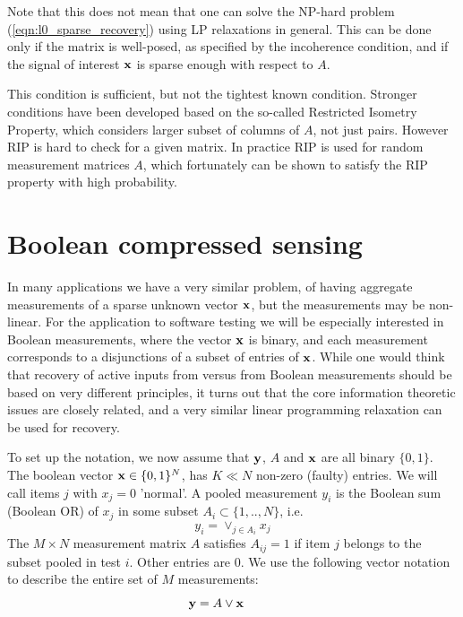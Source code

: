 Note that this does not mean that one can solve the NP-hard problem (\ref{eqn:l0_sparse_recovery})
using LP relaxations in general. This can be done only if the matrix is well-posed, as 
specified by the incoherence condition, and if the signal of interest $\mathbf{x}$ is sparse enough
with respect to $A$. 

This condition is sufficient, but not the tightest known condition. 
Stronger conditions have been developed based on the so-called Restricted Isometry Property, 
\cite{Candes_RIP} which considers larger subset of columns of $A$, not just pairs. 
However RIP is hard to check for a given matrix. In practice RIP is used for random measurement
matrices $A$, which fortunately can be shown to satisfy the RIP property with high probability. \\


\section{ Boolean compressed sensing}

In many applications we have a very similar problem, of having aggregate measurements 
of a sparse unknown vector $\mathbf{x}$, but the measurements may be non-linear.  For the application
to software testing we will be especially interested in Boolean measurements, where the 
vector $\mathbf{x}$ is binary, and each measurement corresponds to a disjunctions of a subset 
of entries of $\mathbf{x}$.  While one would think that recovery of active inputs from 
versus from Boolean measurements should be based on very different principles, it turns
out that the core information theoretic issues are closely related, and a very similar linear
programming relaxation can be used for recovery. 

To set up the notation, we now assume that $\mathbf{y}$, $A$ and $\mathbf{x}$ are all binary $\{0, 1\}$.
The boolean vector $\mathbf{x} \in \{0, 1\}^N$, has $K \ll N$ non-zero (faulty) entries. 
We will call items $j$ with $x_j = 0$ 'normal'. A pooled measurement $y_i$ is the 
Boolean sum (Boolean OR) of $x_j$ in some subset $A_i \subset \{1,..,N\}$, i.e. 
\begin{equation}
y_i = \vee_{j \in A_i} x_j
\end{equation}
The $M \times N$ measurement matrix $A$ satisfies $A_{ij} = 1$ if item $j$ belongs 
to the subset pooled in test $i$. Other entries are $0$. We use the following vector 
notation to describe the entire set of $M$ measurements:
\begin{equation*}
\mathbf{y} = A \vee \mathbf{x}~~~~~~~~
\end{equation*}

